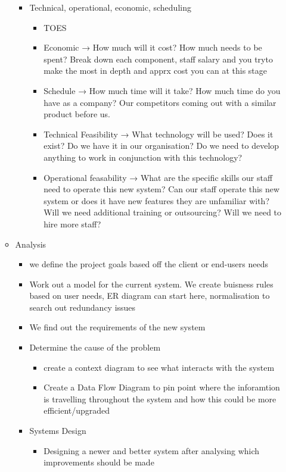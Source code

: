 \documentclass[12pt, a4, twoside]{article}
\begin{document}
\begin{itemize}
\begin{itemize}
\begin{itemize}
        \item Technical, operational, economic, scheduling
        \begin{itemize}
          \item TOES
          \item Economic → How much will it cost? How much needs to be spent? Break down each component, staff salary and you tryto make the most in depth and apprx cost you can at this stage
          \item Schedule → How much time will it take? How much time do you have as a company? Our competitors coming out with a similar product before us.
          \item Technical Feasibility → What technology will be used? Does it exist? Do we have it in our organisation? Do we need to develop anything to work in conjunction with this technology?
          \item Operational feasability → What are the specific skills our staff need to operate this new system? Can our staff operate this new system or does it have new features they are unfamiliar with? Will we need additional training or outsourcing? Will we need to hire more staff?
        \end{itemize}
      \end{itemize}
      \item Analysis
      \begin{itemize}
        \item we define the project goals based off the client or end-users needs
        \item Work out a model for the current system. We create buisness rules based on user needs, ER diagram can start here, normalisation to search out redundancy issues
        \item We find out the requirements of the new system
        \item Determine the cause of the problem
        \begin{itemize}
          \item create a context diagram to see what interacts with the system
          \item Create a Data Flow Diagram to pin point where the inforamtion is travelling throughout the system and how this could be more efficient/upgraded
        \end{itemize}
        \item Systems Design
        \begin{itemize}
          \item Designing a newer and better system after analysing which improvements should be made

\end{itemize}
\end{itemize}
\end{itemize}
\end{itemize}
\end{document}

